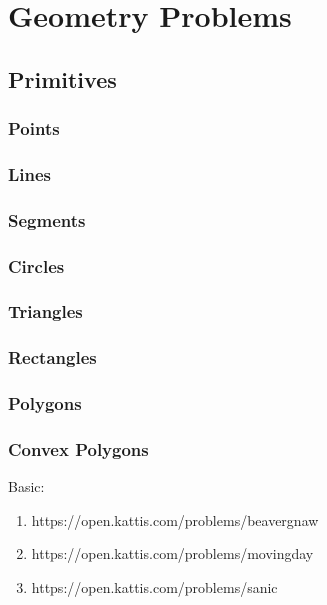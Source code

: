 \section{Geometry Problems}

\subsection{Primitives}

\subsubsection{Points}

\subsubsection{Lines}

\subsubsection{Segments}

\subsubsection{Circles}

\subsubsection{Triangles}

\subsubsection{Rectangles}

\subsubsection{Polygons}

\subsubsection{Convex Polygons}

\hrulefill

Basic:
\begin{enumerate}
\item https://open.kattis.com/problems/beavergnaw
\item https://open.kattis.com/problems/movingday
\item https://open.kattis.com/problems/sanic
\end{enumerate}
